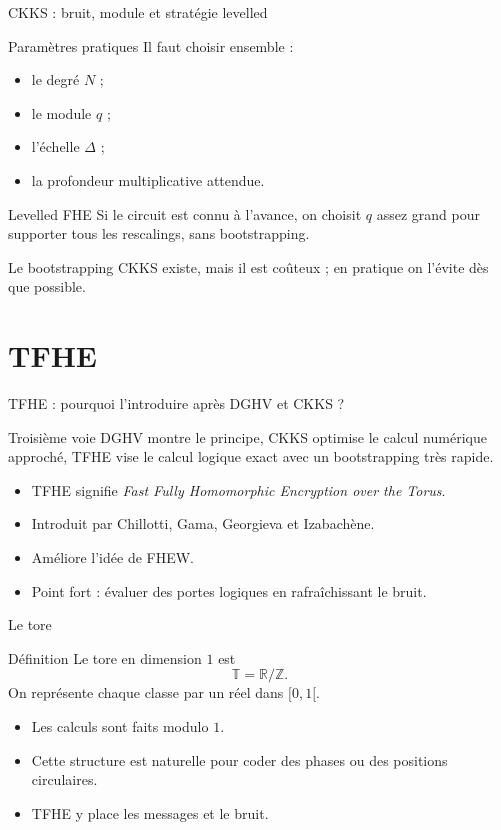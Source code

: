 \documentclass[10pt,aspectratio=169]{beamer}
\newcommand{\ZZ}{\mathbb{Z}}
\newcommand{\RR}{\mathbb{R}}
\newcommand{\TT}{\mathbb{T}}
\begin{document}
\begin{frame}{CKKS : bruit, module et stratégie levelled}
  \begin{block}{Paramètres pratiques}
    Il faut choisir ensemble :
    \begin{itemize}
      \item le degré $N$ ;
      \item le module $q$ ;
      \item l'échelle $\Delta$ ;
      \item la profondeur multiplicative attendue.
    \end{itemize}
  \end{block}

  \begin{exampleblock}{Levelled FHE}
    Si le circuit est connu à l'avance, on choisit $q$ assez grand pour supporter tous les rescalings, sans bootstrapping.
  \end{exampleblock}

  Le bootstrapping CKKS existe, mais il est coûteux ; en pratique on l'évite dès que possible.
\end{frame}

\section{TFHE}

\begin{frame}{TFHE : pourquoi l'introduire après DGHV et CKKS ?}
  \begin{block}{Troisième voie}
    DGHV montre le principe, CKKS optimise le calcul numérique approché, TFHE vise le calcul logique exact avec un bootstrapping très rapide.
  \end{block}

  \begin{itemize}
    \item TFHE signifie \textit{Fast Fully Homomorphic Encryption over the Torus}.
    \item Introduit par Chillotti, Gama, Georgieva et Izabachène.
    \item Améliore l'idée de FHEW.
    \item Point fort : évaluer des portes logiques en rafraîchissant le bruit.
  \end{itemize}
\end{frame}

\begin{frame}{Le tore}
  \begin{block}{Définition}
    Le tore en dimension $1$ est
    \[
      \TT=\RR/\ZZ.
    \]
    On représente chaque classe par un réel dans $[0,1[$.
  \end{block}

  \begin{itemize}
    \item Les calculs sont faits modulo $1$.
    \item Cette structure est naturelle pour coder des phases ou des positions circulaires.
    \item TFHE y place les messages et le bruit.
  \end{itemize}
\end{frame}
\end{document}
